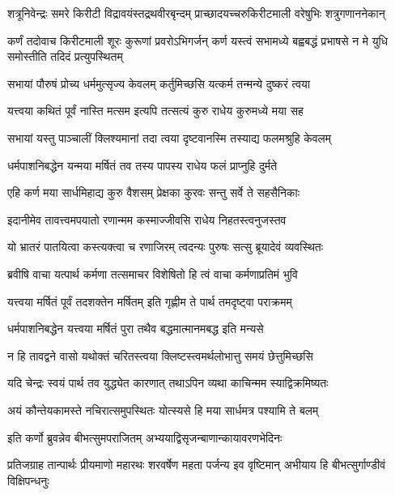 \twolineshloka
{शत्रूनिवेन्द्रः समरे किरीटी विद्रावयंस्तद्रथवीरबृन्दम्}
{प्राच्छादयच्चरुकिरीटमाली वरेषुभिः शत्रुगणाननेकान्}


\onelineshloka
{कर्णं तदोवाच किरीटमाली शूरः कुरूणां प्रवरोऽभिगर्जन्}
\twolineshloka
{कर्ण यस्त्वं सभामध्ये बह्वबद्धं प्रभाषसे}
{न मे युधि समोस्तीति तदिदं प्रत्युपस्थितम्}


\twolineshloka
{सभायां पौरुषं प्रोच्य धर्ममुत्सृज्य केवलम्}
{कर्तुमिच्छसि यत्कर्म तन्मन्ये दुष्करं त्वया}



\twolineshloka
{यत्त्वया कथितं पूर्वं नास्ति मत्सम इत्यपि}
{तत्सत्यं कुरु राधेय कुरुमध्ये मया सह}


\twolineshloka
{सभायां यस्तु पाञ्चालीं क्लिश्यमानां तदा त्वया}
{दृष्टवानस्मि तस्याद्य फलमश्रुहि केवलम्}


\twolineshloka
{धर्मपाशनिबद्धेन यन्मया मर्षितं तव}
{तस्य पापस्य राधेय फलं प्राप्नुहि दुर्मते}


\twolineshloka
{एहि कर्ण मया सार्धमिहाद्य कुरु वैशसम्}
{प्रेक्षका कुरवः सन्तु सर्वे ते सहसैनिकाः}


\twolineshloka
{इदानीमेव तावत्त्वमपयातो रणान्मम}
{कस्माज्जीवसि राधेय निहतस्त्वनुजस्तव}


\twolineshloka
{यो भ्रातरं पातयित्वा कस्त्यक्त्वा च रणाजिरम्}
{त्वदन्यः पुरुषः सत्सु ब्रूयादेवं व्यवस्थितः}




\twolineshloka
{ब्रवीषि वाचा यत्पार्थ कर्मणा तत्समाचर}
{विशेषितो हि त्वं वाचा कर्मणाप्रतिमं भुवि}


\twolineshloka
{यत्त्वया मर्षितं पूर्वं तदशक्तेन मर्षितम्}
{इति गृह्णीम ते पार्थ तमदृष्ट्वा पराक्रमम्}


\twolineshloka
{धर्मपाशनिबद्धेन यत्त्वया मर्षितं पुरा}
{तथैव बद्धमात्मानमबद्ध इति मन्यसे}


\twolineshloka
{न हि तावद्वने वासो यथोक्तं चरितस्त्वया}
{क्लिष्टस्त्वमर्थलोभात्तु समयं छेत्तुमिच्छसि}


\twolineshloka
{यदि चेन्द्रः स्वयं पार्थ तव युद्ध्येत कारणात्}
{तथाऽपिन व्यथा काचिन्मम स्याद्विक्रमिष्यतः}


\twolineshloka
{अयं कौन्तेयकामस्ते नचिरात्समुपस्थितः}
{योत्स्यसे हि मया सार्धमत्र पश्यामि ते बलम्}



\twolineshloka
{इति कर्णो ब्रुवन्नेव बीभत्सुमपराजितम्}
{अभ्ययाद्विसृजन्बाणान्कायावरणभेदिनः}


\onelineshloka
{प्रतिजग्राह तान्पार्थः प्रीयमाणो महारथः}
\twolineshloka
{शरवर्षेण महता पर्जन्य इव वृष्टिमान्}
{अभीयाय हि बीभत्सुर्गाण्डीवं विक्षिपन्धनुः}


